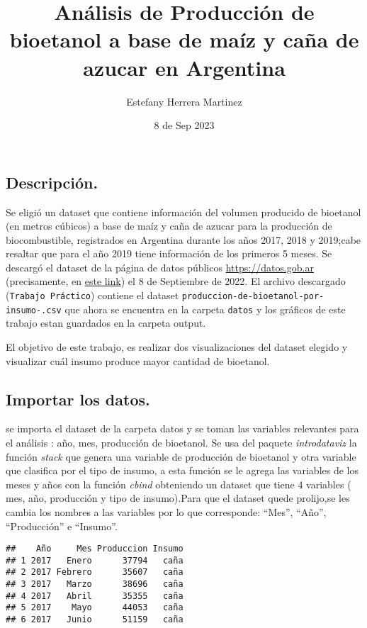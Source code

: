 \documentclass[
]{article}
\title{Análisis de Producción de bioetanol a base de maíz y caña de
azucar en Argentina}
\author{Estefany Herrera Martinez}
\date{8 de Sep 2023}
\begin{document}
\maketitle

{
\setcounter{tocdepth}{2}
\tableofcontents
}
\subsection{Descripción.}\label{descripciuxf3n.}

Se eligió un dataset que contiene información del volumen producido de
bioetanol (en metros cúbicos) a base de maíz y caña de azucar para la
producción de biocombustible, registrados en Argentina durante los años
2017, 2018 y 2019;cabe resaltar que para el año 2019 tiene información
de los primeros 5 meses. Se descargó el dataset de la página de datos
públicos \url{https://datos.gob.ar} (precisamente, en
\href{https://datos.gob.ar/dataset/agroindustria-biocombustible---produccion-por-insumo-bioetanol}{este
link}) el 8 de Septiembre de 2022. El archivo descargado
(\texttt{Trabajo\ Práctico}) contiene el dataset
\texttt{produccion-de-bioetanol-por-insumo-.csv} que ahora se encuentra
en la carpeta \texttt{datos} y los gráficos de este trabajo estan
guardados en la carpeta output.

El objetivo de este trabajo, es realizar dos visualizaciones del dataset
elegido y visualizar cuál insumo produce mayor cantidad de bioetanol.

\subsection{Importar los datos.}\label{importar-los-datos.}

se importa el dataset de la carpeta datos y se toman las variables
relevantes para el análisis : año, mes, producción de bioetanol. Se usa
del paquete \emph{introdataviz} la función \emph{stack} que genera una
variable de producción de bioetanol y otra variable que clasifica por el
tipo de insumo, a esta función se le agrega las variables de los meses y
años con la función \emph{cbind} obteniendo un dataset que tiene 4
variables ( mes, año, producción y tipo de insumo).Para que el dataset
quede prolijo,se les cambia los nombres a las variables por lo que
corresponde: ``Mes'', ``Año'', ``Producción'' e ``Insumo''.

\begin{verbatim}
##    Año     Mes Produccion Insumo
## 1 2017   Enero      37794   caña
## 2 2017 Febrero      35607   caña
## 3 2017   Marzo      38696   caña
## 4 2017   Abril      35355   caña
## 5 2017    Mayo      44053   caña
## 6 2017   Junio      51159   caña
\end{verbatim}
\end{document}
